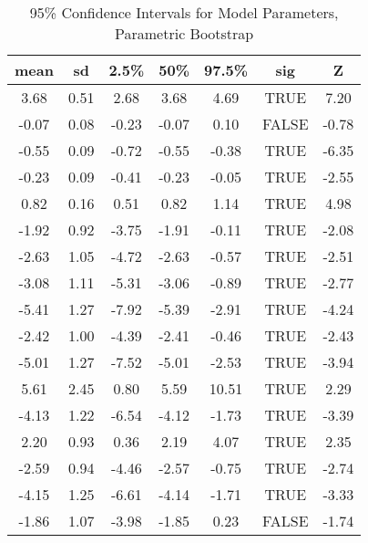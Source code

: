 \begin{table}[H]
\centering
\begin{tabular}{|c|c|c|c|c|c|c|}
  \hline
  \textbf{mean} & \textbf{sd} & \textbf{2.5\%} & \textbf{50\%} & \textbf{97.5\%} & \textbf{sig} & \textbf{Z} \\ 
  \hline
3.68 & 0.51 & 2.68 & 3.68 & 4.69 & TRUE & 7.20 \\ 
  -0.07 & 0.08 & -0.23 & -0.07 & 0.10 & FALSE & -0.78 \\ 
  -0.55 & 0.09 & -0.72 & -0.55 & -0.38 & TRUE & -6.35 \\ 
  -0.23 & 0.09 & -0.41 & -0.23 & -0.05 & TRUE & -2.55 \\ 
  0.82 & 0.16 & 0.51 & 0.82 & 1.14 & TRUE & 4.98 \\ 
  -1.92 & 0.92 & -3.75 & -1.91 & -0.11 & TRUE & -2.08 \\ 
  -2.63 & 1.05 & -4.72 & -2.63 & -0.57 & TRUE & -2.51 \\ 
  -3.08 & 1.11 & -5.31 & -3.06 & -0.89 & TRUE & -2.77 \\ 
  -5.41 & 1.27 & -7.92 & -5.39 & -2.91 & TRUE & -4.24 \\ 
  -2.42 & 1.00 & -4.39 & -2.41 & -0.46 & TRUE & -2.43 \\ 
  -5.01 & 1.27 & -7.52 & -5.01 & -2.53 & TRUE & -3.94 \\ 
  5.61 & 2.45 & 0.80 & 5.59 & 10.51 & TRUE & 2.29 \\ 
  -4.13 & 1.22 & -6.54 & -4.12 & -1.73 & TRUE & -3.39 \\ 
  2.20 & 0.93 & 0.36 & 2.19 & 4.07 & TRUE & 2.35 \\ 
  -2.59 & 0.94 & -4.46 & -2.57 & -0.75 & TRUE & -2.74 \\ 
  -4.15 & 1.25 & -6.61 & -4.14 & -1.71 & TRUE & -3.33 \\ 
  -1.86 & 1.07 & -3.98 & -1.85 & 0.23 & FALSE & -1.74 \\ 
   \hline
\end{tabular}
\caption{95\% Confidence Intervals for Model Parameters, Parametric Bootstrap}
\end{table}
